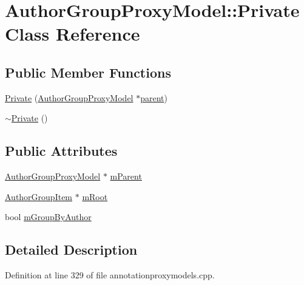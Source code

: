 \hypertarget{classAuthorGroupProxyModel_1_1Private}{\section{Author\+Group\+Proxy\+Model\+:\+:Private Class Reference}
\label{classAuthorGroupProxyModel_1_1Private}
}
\subsection*{Public Member Functions}
\begin{DoxyCompactItemize}
\item 
\hyperlink{classAuthorGroupProxyModel_1_1Private_a820ba644242d4d36807e0e6f78b3b689}{Private} (\hyperlink{classAuthorGroupProxyModel}{Author\+Group\+Proxy\+Model} $\ast$\hyperlink{classAuthorGroupProxyModel_a2181f546bce987d19d5dfa674d0a3f20}{parent})
\item 
\hyperlink{classAuthorGroupProxyModel_1_1Private_a17bceb1c12a9fa16b2a4ea8bb1f70ca3}{$\sim$\+Private} ()
\end{DoxyCompactItemize}
\subsection*{Public Attributes}
\begin{DoxyCompactItemize}
\item 
\hyperlink{classAuthorGroupProxyModel}{Author\+Group\+Proxy\+Model} $\ast$ \hyperlink{classAuthorGroupProxyModel_1_1Private_a307f45d20a7e166fcf26489b35fc3164}{m\+Parent}
\item 
\hyperlink{classAuthorGroupItem}{Author\+Group\+Item} $\ast$ \hyperlink{classAuthorGroupProxyModel_1_1Private_ac1023558be5adf141219d8be245ba47d}{m\+Root}
\item 
bool \hyperlink{classAuthorGroupProxyModel_1_1Private_ac8adbcccfaac17175553d92cdb90dae0}{m\+Group\+By\+Author}
\end{DoxyCompactItemize}


\subsection{Detailed Description}


Definition at line 329 of file annotationproxymodels.\+cpp.



